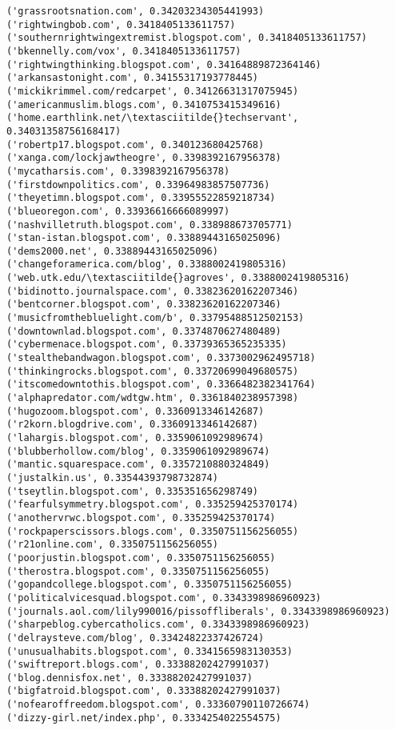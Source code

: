 \documentclass[11pt]{article}
\begin{document}
\begin{Verbatim}[commandchars=\\\{\}]
('grassrootsnation.com', 0.34203234305441993)
('rightwingbob.com', 0.3418405133611757)
('southernrightwingextremist.blogspot.com', 0.3418405133611757)
('bkennelly.com/vox', 0.3418405133611757)
('rightwingthinking.blogspot.com', 0.34164889872364146)
('arkansastonight.com', 0.34155317193778445)
('mickikrimmel.com/redcarpet', 0.34126631317075945)
('americanmuslim.blogs.com', 0.3410753415349616)
('home.earthlink.net/\textasciitilde{}techservant', 0.34031358756168417)
('robertp17.blogspot.com', 0.340123680425768)
('xanga.com/lockjawtheogre', 0.3398392167956378)
('mycatharsis.com', 0.3398392167956378)
('firstdownpolitics.com', 0.33964983857507736)
('theyetimn.blogspot.com', 0.33955522859218734)
('blueoregon.com', 0.33936616666089997)
('nashvilletruth.blogspot.com', 0.338988673705771)
('stan-istan.blogspot.com', 0.33889443165025096)
('dems2000.net', 0.33889443165025096)
('changeforamerica.com/blog', 0.3388002419805316)
('web.utk.edu/\textasciitilde{}agroves', 0.3388002419805316)
('bidinotto.journalspace.com', 0.33823620162207346)
('bentcorner.blogspot.com', 0.33823620162207346)
('musicfromthebluelight.com/b', 0.33795488512502153)
('downtownlad.blogspot.com', 0.3374870627480489)
('cybermenace.blogspot.com', 0.33739365365235335)
('stealthebandwagon.blogspot.com', 0.3373002962495718)
('thinkingrocks.blogspot.com', 0.33720699049680575)
('itscomedowntothis.blogspot.com', 0.3366482382341764)
('alphapredator.com/wdtgw.htm', 0.3361840238957398)
('hugozoom.blogspot.com', 0.3360913346142687)
('r2korn.blogdrive.com', 0.3360913346142687)
('lahargis.blogspot.com', 0.3359061092989674)
('blubberhollow.com/blog', 0.3359061092989674)
('mantic.squarespace.com', 0.3357210880324849)
('justalkin.us', 0.33544393798732874)
('tseytlin.blogspot.com', 0.335351656298749)
('fearfulsymmetry.blogspot.com', 0.335259425370174)
('anothervrwc.blogspot.com', 0.335259425370174)
('rockpaperscissors.blogs.com', 0.3350751156256055)
('r21online.com', 0.3350751156256055)
('poorjustin.blogspot.com', 0.3350751156256055)
('therostra.blogspot.com', 0.3350751156256055)
('gopandcollege.blogspot.com', 0.3350751156256055)
('politicalvicesquad.blogspot.com', 0.3343398986960923)
('journals.aol.com/lily990016/pissoffliberals', 0.3343398986960923)
('sharpeblog.cybercatholics.com', 0.3343398986960923)
('delraysteve.com/blog', 0.33424822337426724)
('unusualhabits.blogspot.com', 0.3341565983130353)
('swiftreport.blogs.com', 0.33388202427991037)
('blog.dennisfox.net', 0.33388202427991037)
('bigfatroid.blogspot.com', 0.33388202427991037)
('nofearoffreedom.blogspot.com', 0.33360790110726674)
('dizzy-girl.net/index.php', 0.3334254022554575)

\end{Verbatim}
\end{document}
